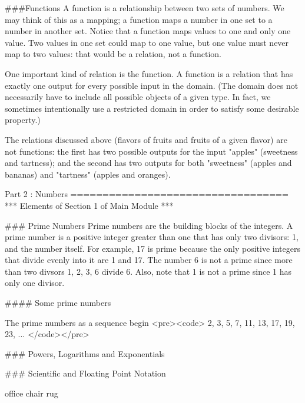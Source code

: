 ###Functions
A function is a relationship between two sets of numbers. 
We may think of this as a mapping; a function maps a number in one set to a number in another set. Notice that a function maps values to one and only one value. Two values in one set could map to one value, 
but one value must never map to two values: that would be a relation, not a function.

One important kind of relation is the function. A function is a relation that has exactly one output for every possible input in the domain. (The domain does not necessarily have to include all possible objects of a given type. In fact, we sometimes intentionally use a restricted domain in order to satisfy some desirable property.) 

The relations discussed above (flavors of fruits and fruits of a given flavor) are not functions: the first has two possible outputs for the input "apples" (sweetness and tartness); and the second has two outputs for both "sweetness" (apples and bananas) and "tartness" (apples and oranges).




Part 2 : Numbers
==================================
*** Elements of Section 1 of Main Module ***

### Prime Numbers
Prime numbers are the building blocks of the integers. A prime number is a positive integer greater than one that has only two divisors: 1, and the number itself. For example, 17 is prime because the only positive integers that divide evenly into it are 1 and 17. The number 6 is not a prime since more than two divsors 1, 2, 3, 6 divide 6. Also, note that 1 is not a prime since 1 has only one divisor.
 
#### Some prime numbers
 
The prime numbers as a sequence begin
<pre><code>
 2, 3, 5, 7, 11, 13, 17, 19, 23, ...
</code></pre>

### Powers, Logarithms and Exponentials

### Scientific and Floating Point Notation




office chair
rug
